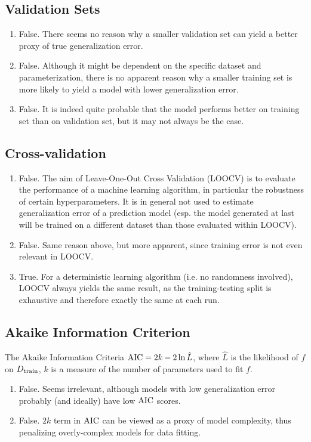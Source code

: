 \documentclass[a4paper, 10pt]{article}
\newcommand{\annot}[1]{{\rm #1}}
\begin{document}
\subsection{Validation Sets}
\begin{enumerate}[label=(\alph*)]
    \item False. There seems no reason why a smaller validation set can yield a better proxy of true generalization error.
    \item False. Although it might be dependent on the specific dataset and parameterization, there is no apparent reason why a smaller training set is more likely to yield a model with lower generalization error.
    \item False. It is indeed quite probable that the model performs better on training set than on validation set, but it may not always be the case.
\end{enumerate}

\subsection{Cross-validation}
\begin{enumerate}[label=(\alph*)]
    \item False. The aim of Leave-One-Out Cross Validation (LOOCV) is to evaluate the performance of a machine learning algorithm, in particular the robustness of certain hyperparameters. It is in general not used to estimate generalization error of a prediction model (esp. the model generated at last will be trained on a different dataset than those evaluated within LOOCV).
    \item False. Same reason above, but more apparent, since training error is not even relevant in LOOCV.
    \item True. For a deterministic learning algorithm (i.e. no randomness involved), LOOCV always yields the same result, as the training-testing split is exhaustive and therefore exactly the same at each run.
\end{enumerate}

\subsection{Akaike Information Criterion}
The Akaike Information Criteria $\annot{AIC} = 2k - 2\ln \hat{L}$, where $\hat{L}$ is the likelihood of $f$ on $D_{\annot{train}}$, $k$ is a measure of the number of parameters used to fit $f$.
\begin{enumerate}[label=(\alph*)]
    \item False. Seems irrelevant, although models with low generalization error probably (and ideally) have low $\annot{AIC}$ scores.
    \item False. $2k$ term in $\annot{AIC}$ can be viewed as a proxy of model complexity, thus penalizing overly-complex models for data fitting.
\end{enumerate}
\end{document}
